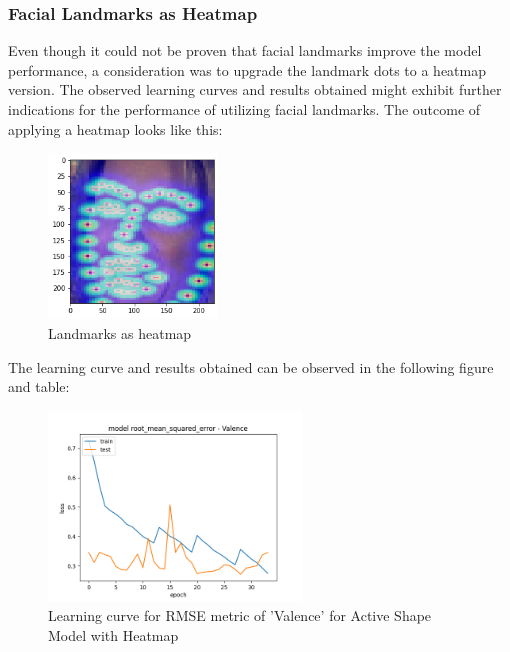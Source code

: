 \subsubsection{Facial Landmarks as Heatmap}
Even though it could not be proven that facial landmarks improve the model performance, a consideration was to upgrade the landmark dots to a heatmap version. The observed learning curves and results obtained might exhibit further indications for the performance of utilizing facial landmarks. The outcome of applying a heatmap looks like this:

\begin{figure}[H]
  \begin{center}
  \includegraphics[angle=0, width=0.4\textwidth]{Figures/landmarks_as_heatmap.png}
  \caption{Landmarks as heatmap}
  \label{fig:LandmarksHeatmap}
  \end{center}
\end{figure}

The learning curve and results obtained can be observed in the following figure and table:

\begin{figure}[H]
  \begin{center}
  \includegraphics[angle=0, width=0.6\textwidth]{Figures/rmse_out1_heatmap.png}
  \caption{Learning curve for RMSE metric of 'Valence' for Active Shape Model with Heatmap}
  \label{fig:ASMHeatmap}
  \end{center}
\end{figure}


